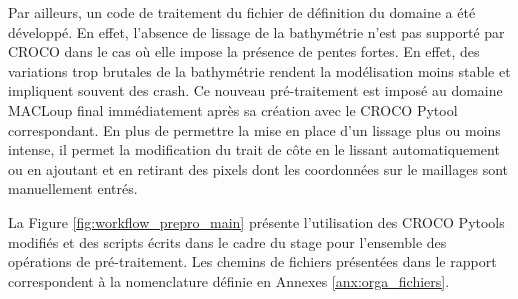 \documentclass[10pt,a4paper,titlepage]{article}
\begin{document}
Par ailleurs, un code de traitement du fichier de définition du domaine a été développé.
En effet, l'absence de lissage de la bathymétrie n'est pas supporté par CROCO dans le cas où elle impose la présence de pentes fortes.
En effet, des variations trop brutales de la bathymétrie rendent la modélisation moins stable et impliquent souvent des crash.
Ce nouveau pré-traitement est imposé au domaine MACLoup final immédiatement après sa création avec le CROCO Pytool correspondant.
En plus de permettre la mise en place d'un lissage plus ou moins intense, il permet la modification du trait de côte en le lissant automatiquement ou en ajoutant et en retirant des pixels dont les coordonnées sur le maillages sont manuellement entrés.

La Figure \ref{fig:workflow_prepro_main} présente l'utilisation des CROCO Pytools modifiés et des scripts écrits dans le cadre du stage pour l'ensemble des opérations de pré-traitement.
Les chemins de fichiers présentées dans le rapport correspondent à la nomenclature définie en Annexes \ref{anx:orga_fichiers}.
\end{document}
